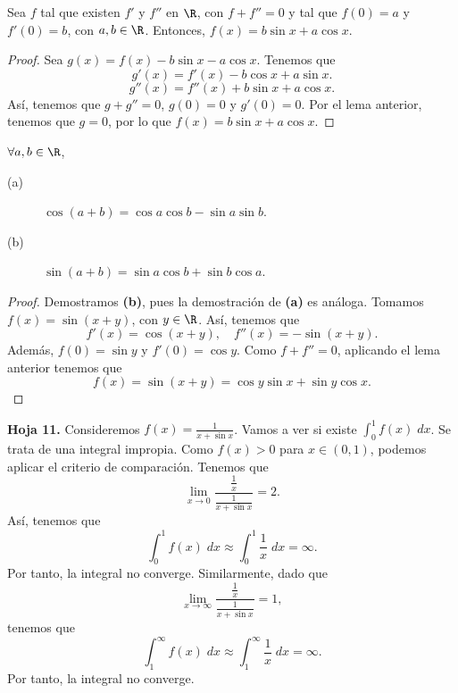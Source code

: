 \begin{flema}[]
\normalfont Sea $\displaystyle f $ tal que existen $\displaystyle f' $ y $\displaystyle f'' $ en $\displaystyle \R $, con $\displaystyle f + f'' = 0 $ y tal que $\displaystyle f\left(0\right) = a $ y $\displaystyle f'\left(0\right) = b $, con $\displaystyle a,b \in \R $. Entonces, $\displaystyle f\left(x\right) = b\sin x + a \cos x $.
\end{flema}
\begin{proof}
Sea $\displaystyle g\left(x\right) = f\left(x\right)-b\sin x - a \cos x $. Tenemos que
\[g'\left(x\right) = f'\left(x\right) - b\cos x + a\sin x .\]
\[g''\left(x\right) = f''\left(x\right) + b \sin x + a \cos x .\]
Así, tenemos que $\displaystyle g + g'' = 0 $, $\displaystyle g\left(0\right) = 0 $ y $\displaystyle g'\left(0\right) = 0 $. Por el lema anterior, tenemos que $\displaystyle g = 0 $, por lo que $\displaystyle f\left(x\right) = b\sin x + a \cos x $.
\end{proof}
\begin{ftheorem}[]
\normalfont $\displaystyle \forall a,b \in \R $, 
\begin{description}
\item[(a)] $\displaystyle \cos\left(a+b\right) = \cos a \cos b - \sin a \sin b $.
\item[(b)] $\displaystyle \sin\left(a+b\right) = \sin a \cos b + \sin b \cos a $.
\end{description}
\end{ftheorem}
\begin{proof}
Demostramos \textbf{(b)}, pues la demostración de \textbf{(a)} es análoga. Tomamos $\displaystyle f\left(x\right) = \sin\left(x+y\right) $, con $\displaystyle y \in \R $. Así, tenemos que 
\[f'\left(x\right) = \cos\left(x+y\right), \quad f''\left(x\right) = -\sin\left(x+y\right) .\]
Además, $\displaystyle f\left(0\right) = \sin y $ y $\displaystyle f'\left(0\right) = \cos y $. Como $\displaystyle f + f'' = 0 $, aplicando el lema anterior tenemos que 
\[f\left(x\right) = \sin\left(x+y\right) = \cos y \sin x + \sin y \cos x .\]
\end{proof}
\begin{eg}
\normalfont \textbf{Hoja 11.} Consideremos $\displaystyle f\left(x\right) = \frac{1}{x + \sin x} $. Vamos a ver si existe $\displaystyle \int^{1}_{0} f\left(x\right) \; dx $. Se trata de una integral impropia. Como $\displaystyle f\left(x\right) > 0 $ para $\displaystyle x \in \left(0,1\right) $, podemos aplicar el criterio de comparación. Tenemos que
\[\lim_{x \to 0}\frac{\frac{1}{x}}{\frac{1}{x+\sin x}} = 2.\]
Así, tenemos que
\[ \int^{1}_{0} f\left(x\right) \; dx \approx \int^{1}_{0} \frac{1}{x} \; dx = \infty .\]
Por tanto, la integral no converge.
Similarmente, dado que 
\[\lim_{x \to \infty}\frac{\frac{1}{x}}{\frac{1}{x+\sin x}} = 1 ,\]
tenemos que
\[\int^{\infty}_{1} f\left(x\right) \; dx \approx \int^{\infty}_{1} \frac{1}{x} \; dx = \infty .\]
Por tanto, la integral no converge.
\end{eg}
